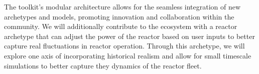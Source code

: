 The toolkit's modular architecture allows for the seamless integration of new
archetypes and models, promoting innovation and collaboration within the
\cyclus community. We will additionally contribute to the ecosystem with a
reactor archetype that can adjust the power of the reactor based on user inputs
to better capture real fluctuations in reactor operation. Through this
archetype, we will explore one axis of incorporating historical realism and
allow for small timescale simulations to better capture they dynamics of the
reactor fleet.


